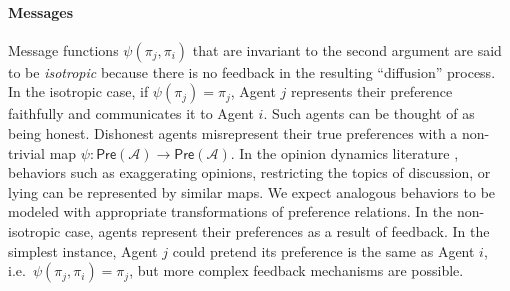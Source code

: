\documentclass[conference]{ieeeconf}
\newcommand{\A}{\mathcal{A}}
\newcommand{\Pref}{\mathsf{Pre}}
\begin{document}
\paragraph*{Messages}
Message functions $\psi(\pi_j,\pi_i)$ that are invariant to the second argument are said to be \emph{isotropic} because there is no feedback in the resulting ``diffusion'' process. In the isotropic case, if $\psi(\pi_j) = \pi_j$, Agent $j$ represents their preference faithfully and communicates it to Agent $i$. Such agents can be thought of as being honest. Dishonest agents misrepresent their true preferences with a non-trivial map $\psi: \Pref(\A) \to \Pref(\A)$. In the opinion dynamics literature \cite{hansen2021}, behaviors such as exaggerating opinions, restricting the topics of discussion, or lying can be represented by similar maps. We expect analogous behaviors to be modeled with appropriate transformations of preference relations. In the non-isotropic case, agents represent their preferences as a result of feedback. In the simplest instance, Agent $j$ could pretend its preference is the same as Agent $i$, i.e.~$\psi(\pi_j,\pi_i) = \pi_j$, but more complex feedback mechanisms are possible.
\end{document}
